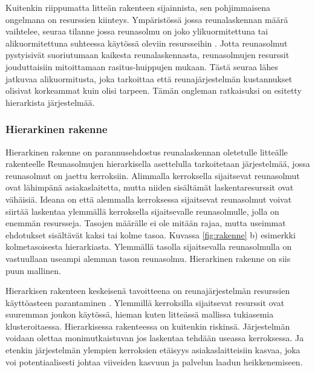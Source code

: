 Kuitenkin riippumatta litteän rakenteen sijainnista, sen pohjimmaisena ongelmana on resurssien kiinteys. Ympäristössä jossa reunalaskennan määrä vaihtelee, seuraa tilanne jossa reunasolmu on joko ylikuormitettuna tai alikuormitettuna suhteessa käytössä oleviin resursseihin \cite{tong2016hierarchical}. Jotta reunasolmut pystyisivät suoriutumaan kaikesta reunalaskennasta, reunasolmujen resurssit jouduttaisiin mitoittamaan rasitus-huippujen mukaan. Tästä seuraa lähes jatkuvaa alikuormitusta, joka tarkoittaa että reunajärjestelmän kustannukset olisivat korkeammat kuin olisi tarpeen. 
Tämän ongleman ratkaisuksi on esitetty hierarkista järjestelmää.




\subsubsection{Hierarkinen rakenne}
Hierarkinen rakenne on parannusehdostus reunalaskennan oletetulle litteälle rakenteelle \cite{tong2016hierarchical}
Reunasolmujen hierarkisella asettelulla tarkoitetaan järjestelmää, jossa reunasolmut on jaettu kerroksiin. Alimmalla kerroksella sijaitsevat reunasolmut ovat lähimpänä asiakaslaitetta, mutta niiden sisältämät laskentaresurssit ovat vähäisiä. 
Ideana on että alemmalla kerroksessa sijaitsevat reunasolmut voivat siirtää laskentaa ylemmällä kerroksella sijaitsevalle reunasolmulle, jolla on enemmän resursseja. Tasojen määrälle ei ole mitään rajaa, mutta useimmat ehdotukset sisältävät kaksi tai kolme tasoa. Kuvassa \ref{fig:rakenne} b) esimerkki kolmetasoisesta hierarkiasta.
Ylemmällä tasolla sijaitsevalla reunasolmulla on vastuullaan useampi alemman tason reunasolmu. Hierarkinen rakenne on siis puun mallinen.

Hierarkisen rakenteen keskeisenä tavoitteena on reunajärjestelmän resurssien käyttöasteen parantaminen \cite{tong2016hierarchical}. Ylemmillä kerroksilla sijaitsevat resurssit ovat suuremman joukon käytössä, hieman kuten litteässä mallissa tukiasemia klusteroitaessa. 
Hierarkisessa rakenteessa on kuitenkin riskinsä. Järjestelmän voidaan olettaa monimutkaistuvan jos laskentaa tehdään useassa kerroksessa. Ja etenkin järjestelmän ylempien kerroksien etäisyys asiakaslaitteisiin kasvaa, joka voi potentiaalisesti johtaa viiveiden kasvuun ja palvelun laadun heikkenemiseen.


